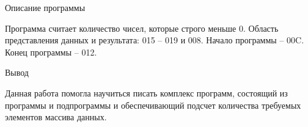 \documentclass{article}
\begin{document}
\begin{center}
    \hline Описание программы

Программа считает количество чисел, которые строго меньше 0.
Область представления данных и результата: 015 – 019 и 008.
Начало программы – 00C.
Конец программы – 012.

Вывод

Данная работа помогла научиться писать комплекс программ, состоящий из программы
и подпрограммы и обеспечивающий подсчет количества требуемых элементов массива
данных.
\end{center}
\end{document}
